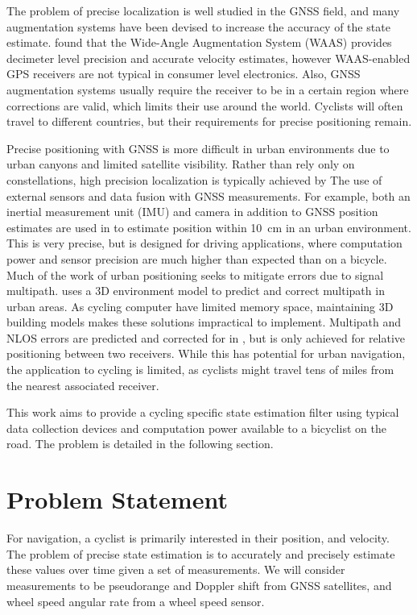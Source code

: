\documentclass[letterpaper,times]{IONconf}
\begin{document}
The problem of precise localization is well studied in the GNSS field, and many augmentation systems have been devised to increase the accuracy of the state estimate. \cite{Witte05} found that the Wide-Angle Augmentation System (WAAS) provides decimeter level precision and accurate velocity estimates, however WAAS-enabled GPS receivers are not typical in consumer level electronics. Also, GNSS augmentation systems usually require the receiver to be in a certain region where corrections are valid, which limits their use around the world. Cyclists will often travel to different countries, but their requirements for precise positioning remain. 

Precise positioning with GNSS is more difficult in urban environments due to urban canyons and limited satellite visibility. Rather than rely only on constellations, high precision localization is typically achieved by The use of external sensors and data fusion with GNSS measurements. For example, both an inertial measurement unit (IMU) and camera in addition to GNSS position estimates are used in \cite{Lategahn13} to estimate position within \SI{10}{cm} in an urban environment. This is very precise, but is designed for  driving applications, where computation power and sensor precision are much higher than expected than on a bicycle. Much of the work of urban positioning seeks to mitigate errors due to signal multipath. \cite{Obst12} uses a 3D environment model to predict and correct multipath in urban areas. As cycling computer have limited memory space, maintaining 3D building models makes these solutions impractical to implement. Multipath and NLOS errors are predicted and corrected for in \cite{Yuan20}, but is only achieved for relative positioning between two receivers. While this has potential for urban navigation, the application to cycling is limited, as cyclists might travel tens of miles from the nearest associated receiver. 

This work aims to provide a cycling specific state estimation filter using typical data collection devices and computation power available to a bicyclist on the road. The problem is detailed in the following section.

\section{Problem Statement}

\newcommand{\R}{R_{ECEF\to ENU}}

For navigation, a cyclist is primarily interested in their position, and velocity. The problem of precise state estimation is to accurately and precisely estimate these values over time given a set of measurements. We will consider measurements to be pseudorange and Doppler shift from GNSS satellites, and wheel speed angular rate from a wheel speed sensor.
\end{document}
